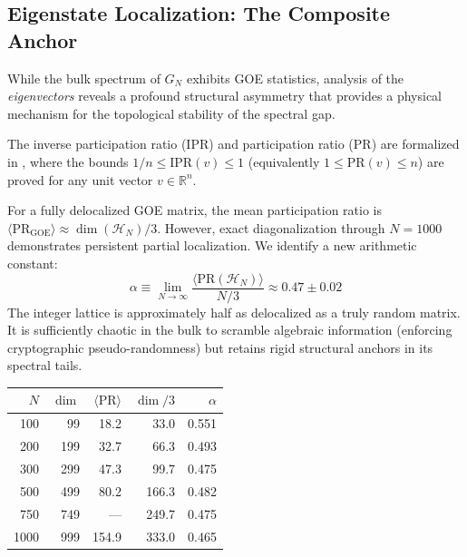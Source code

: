 \documentclass[11pt,a4paper]{article}
\begin{document}
\subsection{Eigenstate Localization: The Composite Anchor}
\label{sec:localization}

While the bulk spectrum of $G_N$ exhibits GOE statistics, analysis of the
\emph{eigenvectors} reveals a profound structural asymmetry that provides
a physical mechanism for the topological stability of the spectral gap.

The inverse participation ratio (IPR) and participation ratio (PR) are
formalized in , where the bounds
$1/n \leq \mathrm{IPR}(v) \leq 1$ (equivalently $1 \leq \mathrm{PR}(v) \leq n$)
are proved for any unit vector $v \in \mathbb{R}^n$.

\begin{correspondence}
For a fully delocalized GOE matrix, the mean participation ratio is
$\langle \mathrm{PR}_{\mathrm{GOE}} \rangle \approx \dim(\mathcal{H}_N)/3$.
However, exact diagonalization through $N = 1000$ demonstrates persistent
partial localization. We identify a new arithmetic constant:
\begin{equation}
  \alpha \equiv \lim_{N \to \infty}
  \frac{\langle \mathrm{PR}(\mathcal{H}_N) \rangle}{N/3}
  \approx 0.47 \pm 0.02
  \label{eq:alpha}
\end{equation}
The integer lattice is approximately half as delocalized as a truly random
matrix. It is sufficiently chaotic in the bulk to scramble algebraic
information (enforcing cryptographic pseudo-randomness) but retains rigid
structural anchors in its spectral tails.

\begin{center}
\small
\begin{tabular}{@{}rrrrr@{}}
\toprule
$N$ & $\dim$ & $\langle\mathrm{PR}\rangle$ & $\dim/3$ & $\alpha$ \\
\midrule
100  & 99  & 18.2  & 33.0  & 0.551 \\
200  & 199 & 32.7  & 66.3  & 0.493 \\
300  & 299 & 47.3  & 99.7  & 0.475 \\
500  & 499 & 80.2  & 166.3 & 0.482 \\
750  & 749 & ---   & 249.7 & 0.475 \\
1000 & 999 & 154.9 & 333.0 & 0.465 \\
\bottomrule
\end{tabular}
\end{center}
\end{correspondence}
\end{document}
